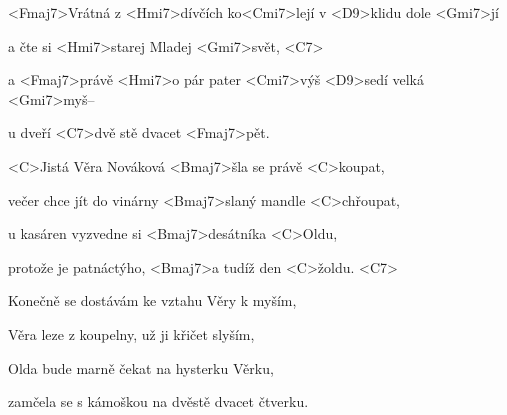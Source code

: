 

\zr
<Fmaj7>Vrátná z <Hmi7>dívčích ko<Cmi7>lejí v <D9>klidu 
dole <Gmi7>jí

a čte si <Hmi7>starej Mladej <Gmi7>svět, <C7>

a <Fmaj7>právě <Hmi7>o pár pater <Cmi7>výš <D9>sedí velká <Gmi7>myš--

u dveří <C7>dvě stě dvacet <Fmaj7>pět.
\kr

\zs
<C>Jistá Věra Nováková <Bmaj7>šla se právě <C>koupat,

večer chce jít do vinárny <Bmaj7>slaný mandle <C>chřoupat,

u kasáren vyzvedne si <Bmaj7>desátníka <C>Oldu,

protože je patnáctýho, <Bmaj7>a tudíž den <C>žoldu. <C7>
\ks

\zr \kr

\zs
Konečně se dostávám ke vztahu Věry k myším,

Věra leze z koupelny, už ji křičet slyším,

Olda bude marně čekat na hysterku Věrku,

zamčela se s kámoškou na dvěstě dvacet čtverku.
\ks

\zr \kr

\kp






